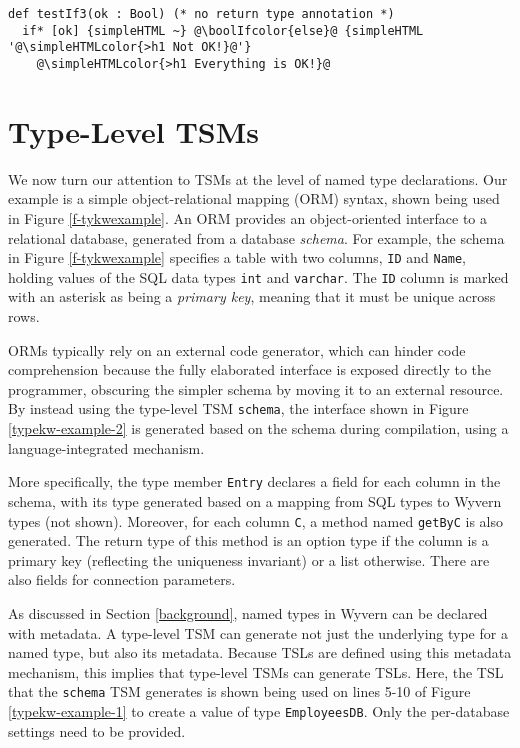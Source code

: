 \documentclass{sig-alternate}
\newcommand{\simpleHTMLcolor}[1]{\textcolor[HTML]{7D5100}{#1}}
\newcommand{\boolIfcolor}[1]{\textcolor[HTML]{5E0C0C}{#1}}
\begin{document}
\begin{lstlisting}[style=wyvern]
def testIf3(ok : Bool) (* no return type annotation *)
  if* [ok] {simpleHTML ~} @\boolIfcolor{else}@ {simpleHTML '@\simpleHTMLcolor{>h1 Not OK!}@'}
    @\simpleHTMLcolor{>h1 Everything is OK!}@
\end{lstlisting}

\section{Type-Level TSM\lowercase{s}}\label{tsms-type}
We now turn our attention to TSMs at the level of named type declarations. Our example is a simple object-relational mapping (ORM) syntax, shown being used in Figure \ref{f-tykwexample}. An ORM provides an object-oriented interface to a relational database, generated from a database \emph{schema}. For example, the schema in Figure \ref{f-tykwexample} specifies a table with two columns, \verb|ID| and \verb|Name|, holding values of the SQL data types \verb|int| and \verb|varchar|. The \verb|ID| column is marked with an asterisk as being a \emph{primary key}, meaning that it must be unique across rows. 

ORMs typically rely on an external code generator, which can hinder code comprehension because the fully elaborated interface is exposed directly to the programmer, obscuring the simpler schema by moving it to an external resource. By instead using the type-level TSM \verb|schema|, the interface shown in Figure \ref{typekw-example-2} is generated based on the schema during compilation, using a language-integrated mechanism. 

More specifically, the type member \verb|Entry| declares a field for each column in the schema, with its type generated based on a mapping from SQL types to Wyvern types (not shown). Moreover, for each column \verb|C|, a method named \verb|getByC| is also generated. The return type of this method is an option type if the column is a primary key (reflecting the uniqueness invariant) or a list otherwise. There are also fields for connection parameters. 

As discussed in Section \ref{background}, named types in Wyvern can be declared with  metadata. A type-level TSM can generate not just the underlying type for a named type, but also its metadata. Because TSLs are defined using this metadata mechanism, this implies that type-level TSMs can generate TSLs. Here, the TSL that the \verb|schema| TSM generates is shown being used on lines 5-10 of Figure \ref{typekw-example-1} to create a value of type \verb|EmployeesDB|. Only the per-database settings need to be provided. %
\end{document}
